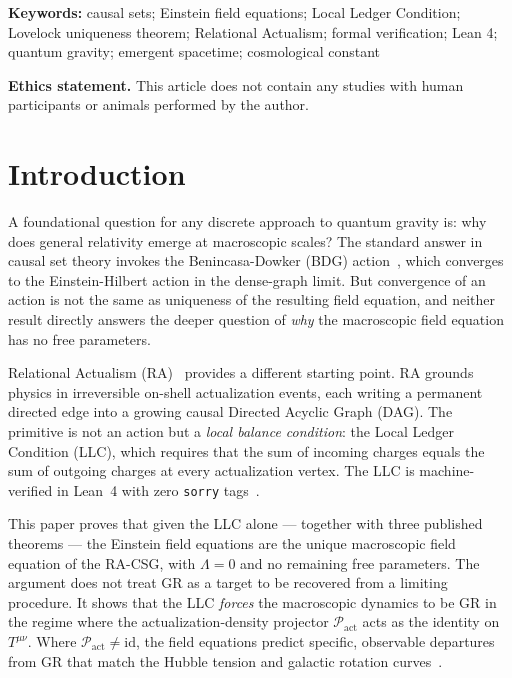 \documentclass[11pt,a4paper]{article}
\newcommand{\Pact}{\mathcal{P}_{\mathrm{act}}}
\begin{document}
\noindent\textbf{Keywords:} causal sets; Einstein field equations; Local Ledger Condition; Lovelock uniqueness theorem; Relational Actualism; formal verification; Lean 4; quantum gravity; emergent spacetime; cosmological constant

\medskip
\noindent\textbf{Ethics statement.}
This article does not contain any studies with human participants
or animals performed by the author.



\section{Introduction}
\label{sec:intro}

A foundational question for any discrete approach to quantum gravity
is: why does general relativity emerge at macroscopic scales? The
standard answer in causal set theory invokes the Benincasa-Dowker
(BDG) action~\citep{Benincasa2010}, which converges to the
Einstein-Hilbert action in the dense-graph limit. But convergence of
an action is not the same as uniqueness of the resulting field
equation, and neither result directly answers the deeper question of
\emph{why} the macroscopic field equation has no free parameters.

Relational Actualism (RA)~\citep{Sandeman2026RAQM} provides a
different starting point. RA grounds physics in irreversible on-shell
actualization events, each writing a permanent directed edge into a
growing causal Directed Acyclic Graph (DAG). The primitive is not an
action but a \emph{local balance condition}: the Local Ledger
Condition (LLC), which requires that the sum of incoming charges
equals the sum of outgoing charges at every actualization vertex.
The LLC is machine-verified in Lean~4 with zero \texttt{sorry}
tags~\citep{Sandeman2026RAGC}.

This paper proves that given the LLC alone --- together with three
published theorems --- the Einstein field equations are the unique
macroscopic field equation of the RA-CSG, with $\Lambda = 0$ and no
remaining free parameters. The argument does not treat GR as a target
to be recovered from a limiting procedure. It shows that the LLC
\emph{forces} the macroscopic dynamics to be GR in the regime where
the actualization-density projector $\Pact$ acts as the identity on
$T^{\mu\nu}$. Where $\Pact \neq \mathrm{id}$, the field equations
predict specific, observable departures from GR that match the Hubble
tension and galactic rotation curves~\citep{Sandeman2026RAGC,
Sandeman2026RADM}.
\end{document}
